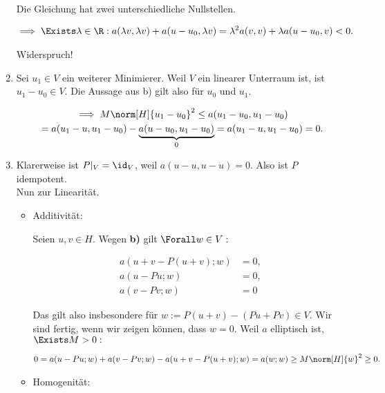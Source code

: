 \begin{solution}
\begin{enumerate}[label = \textbf{\alph*)}]
  Die Gleichung hat zwei unterschiedliche Nullstellen.

  \begin{align*}
    \implies
    \Exists \lambda \in \R:
    a(\lambda v, \lambda v) + a(u - u_0, \lambda v)
    =
    \lambda^2 a(v,v) + \lambda a(u - u_0, v) < 0.
  \end{align*}

  Widerspruch!

  \item Sei $u_1 \in V$ ein weiterer Minimierer.
  Weil $V$ ein linearer Unterraum ist, ist $u_1 - u_0 \in V$.
  Die Aussage aus b) gilt also für $u_0$ und $u_1$.

  \begin{multline*}
    \implies
    M \norm[H]{u_1 - u_0}^2
    \leq
    a(u_1 - u_0, u_1 - u_0) \\
    =
    a(u_1 - u, u_1 - u_0)
    -
    \underbrace{a(u - u_0, u_1 - u_0)}_0
    =
    a(u_1 - u, u_1 - u_0) = 0.
  \end{multline*}

  \item Klarerweise ist $P|_V = \id_V$, weil $a(u - u, u - u) = 0$.
  Also ist $P$ idempotent. \\
  Nun zur Linearität.

  \begin{itemize}

    \item Additivität:

    Seien $u, v \in H$.
    Wegen \textbf{b)} gilt $\Forall w \in V:$

      \begin{align*}
        a(u + v - P(u + v); w) & = 0, \\
        a(u - Pu; w) & = 0, \\
        a(v - Pv; w) & = 0
      \end{align*}

    Das gilt also insbesondere für $w := P(u + v) - (Pu + Pv) \in V$.
    Wir sind fertig, wenn wir zeigen können, dass $w = 0$.
    Weil $a$ elliptisch ist, $\Exists M > 0:$

    \begin{align*}
      0 =
      a(u - Pu; w)
      +
      a(v - Pv; w)
      -
      a(u + v - P(u + v); w)
      =
      a(w; w)
      \geq
      M \norm[H]{w}^2
      \geq 0.
    \end{align*}

    \item Homogenität:


\end{itemize}
\end{enumerate}
\end{solution}
